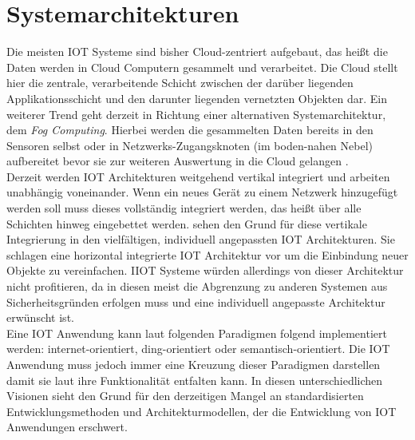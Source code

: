 \documentclass[BMR,Bachelor,ngerman]{twbook}%
\begin{document}
\section{Systemarchitekturen}
Die meisten \ac{IOT} Systeme sind bisher Cloud-zentriert aufgebaut, das heißt die Daten werden in Cloud Computern gesammelt und verarbeitet. Die Cloud stellt hier die zentrale, verarbeitende Schicht zwischen der darüber liegenden Applikationsschicht und den darunter liegenden vernetzten Objekten dar. Ein weiterer Trend geht derzeit in Richtung einer alternativen Systemarchitektur, dem \emph{Fog Computing}. Hierbei werden die gesammelten Daten bereits in den Sensoren selbst oder in Netzwerks-Zugangsknoten (im boden-nahen Nebel) aufbereitet bevor sie zur weiteren Auswertung in die Cloud gelangen \cite{sethi2017internet}.\\\newline
Derzeit werden \ac{IOT} Architekturen weitgehend vertikal integriert und arbeiten unabhängig voneinander. Wenn ein neues Gerät zu einem Netzwerk hinzugefügt werden soll muss dieses vollständig integriert werden, das heißt über alle Schichten hinweg eingebettet werden.  sehen den Grund für diese vertikale Integrierung in den vielfältigen, individuell angepassten \ac{IOT} Architekturen. Sie schlagen eine horizontal integrierte \ac{IOT} Architektur vor um die Einbindung neuer Objekte zu vereinfachen. \ac{IIOT} Systeme würden allerdings von dieser Architektur nicht profitieren, da in diesen meist die Abgrenzung zu anderen Systemen aus Sicherheitsgründen erfolgen muss und eine individuell angepasste Architektur erwünscht ist.\\\newline
Eine \ac{IOT} Anwendung kann laut  folgenden Paradigmen folgend implementiert werden: internet-orientiert, ding-orientiert oder semantisch-orientiert. Die \ac{IOT} Anwendung muss jedoch immer eine Kreuzung dieser Paradigmen darstellen damit sie laut  ihre Funktionalität entfalten kann. In diesen unterschiedlichen Visionen sieht  den Grund für den derzeitigen Mangel an standardisierten Entwicklungsmethoden und Architekturmodellen, der die Entwicklung von \ac{IOT} Anwendungen erschwert.\clearpage
\end{document}
